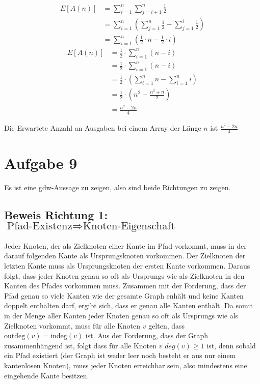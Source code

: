 \documentclass[parskip=half,a4paper]{scrartcl}
\begin{document}
\begin{equation}
\begin{aligned}
   E\left[A(n)\right] &= \sum_{i=1}^{n}{\sum_{j=i+1}^{n}{\frac{1}{2}}}\\
   &= \sum_{i=1}^{n}{\left(\sum_{j=1}^{n}{\frac{1}{2}} - \sum_{j=1}^{i}{\frac{1}{2}}\right)}\\
   &= \sum_{i=1}^{n}{\left(\frac{1}{2}\cdot n - \frac{1}{2}\cdot i\right)}
\end{aligned}
\end{equation}
\begin{equation}
\begin{aligned}
   E\left[A(n)\right] &= \frac{1}{2} \cdot \sum_{i=1}^{n}{\left(n - i\right)}\\
   &= \frac{1}{2} \cdot \sum_{i=1}^{n}{\left(n - i\right)}\\
   &= \frac{1}{2} \cdot \left(\sum_{i=1}^{n}{n} - \sum_{i=1}^{n}{i}\right)\\
   &= \frac{1}{2} \cdot \left(n^2 - \frac{n^2 + n}{2}\right)\\
   &= \frac{n^2 - 2n}{4}
\end{aligned}
\end{equation}

Die Erwartete Anzahl an Ausgaben bei einem Array der Länge $n$ ist $\frac{n^2 - 2n}{4}$

\section*{Aufgabe 9}

Es ist eine gdw-Aussage zu zeigen, also sind beide Richtungen zu zeigen.

\subsection*{Beweis Richtung 1: $\text{Pfad-Existenz} \Rightarrow \text{Knoten-Eigenschaft}$}

Jeder Knoten, der als Zielknoten einer Kante im Pfad vorkommt, muss in der darauf folgenden Kante als Ursprungsknoten vorkommen. Der Zielknoten der letzten Kante muss als Ursprungsknoten der ersten Kante vorkommen. Daraus folgt, dass jeder Knoten genau so oft als Ursprungs wie als Zielknoten in den Kanten des Pfades vorkommen muss. Zusammen mit der Forderung, dass der Pfad genau so viele Kanten wie der gesamte Graph enhält und keine Kanten doppelt enthalten darf, ergibt sich, dass er genau alle Kanten enthält. Da somit in der Menge aller Kanten jeder Knoten genau so oft als Ursprungs wie als Zielknoten vorkommt, muss für alle Knoten $v$ gelten, dass $\text{outdeg}(v) = \text{indeg}(v)$ ist. Aus der Forderung, dass der Graph zusammenhängend ist, folgt dass für alle Knoten $v$ $deg(v) \ge 1$ ist, denn sobald ein Pfad existiert (der Graph ist weder leer noch besteht er aus nur einem kantenlosen Knoten), muss jeder Knoten erreichbar sein, also mindestens eine eingehende Kante besitzen.
\end{document}
